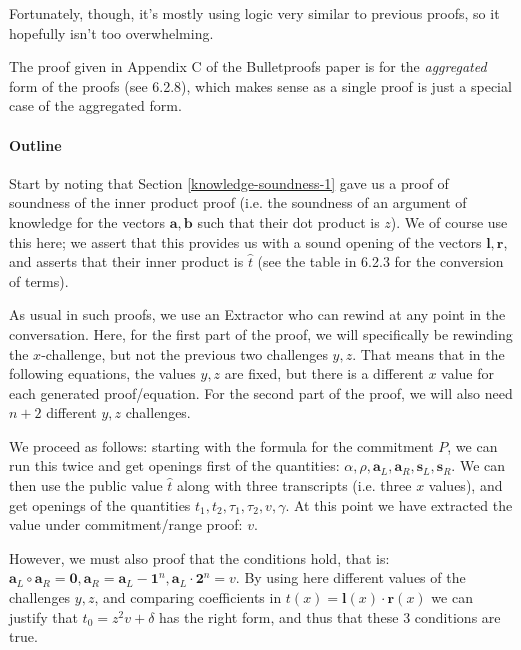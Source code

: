 \documentclass[10pt,a4paper]{article}
\begin{document}
Fortunately, though, it's mostly using logic very similar to previous
proofs, so it hopefully isn't too overwhelming.

The proof given in Appendix C of the Bulletproofs paper is for the
\emph{aggregated} form of the proofs (see 6.2.8), which makes sense as a
single proof is just a special case of the aggregated form.

\hypertarget{outline}{%
\paragraph[Outline]{\texorpdfstring{\protect\hypertarget{anchor-64}{}{}Outline}{Outline}}\label{outline}}

Start by noting that Section \ref{knowledge-soundness-1} gave us a proof of soundness of the
inner product proof (i.e. the soundness of an argument of knowledge for
the vectors $\mathbf{a}, \mathbf{b}$ such that their dot product is $z$). We of course use this
here; we assert that this provides us with a sound opening of the
vectors $\mathbf{l}, \mathbf{r}$, and asserts that their inner product is $\hat{t}$ (see the table in
6.2.3 for the conversion of terms).

As usual in such proofs, we use an Extractor who can rewind at any point
in the conversation. Here, for the first part of the proof, we will
specifically be rewinding the $x$-challenge, but not the previous two
challenges $y,z$. That means that in the following equations, the values $y,z$ are
fixed, but there is a different $x$ value for each generated proof/equation.
For the second part of the proof, we will also need $n+2$ different $y,z$
challenges.

We proceed as follows: starting with the formula for the commitment $P$, we
can run this twice and get openings first of the quantities: $\alpha, \rho, \textbf{a}_L, \textbf{a}_R, \textbf{s}_L, \textbf{s}_R$. We can
then use the public value $\hat{t}$ along with three transcripts (i.e. three $x$
values), and get openings of the quantities $t_1, t_2, \tau_1, \tau_2, v, \gamma$. At this point we have
extracted the value under commitment/range proof: $v$.

However, we must also proof that the conditions hold, that is: $\textbf{a}_L \circ \textbf{a}_R = \textbf{0}, \textbf{a}_R = \textbf{a}_L - \textbf{1}^n, \textbf{a}_L \cdot \textbf{2}^n = v$. By
using here different values of the challenges $y,z$, and comparing
coefficients in $t(x) = \textbf{l}(x) \cdot \textbf{r}(x)$ we can justify that $t_0 = z^2v + \delta$ has the right form, and thus that
these 3 conditions are true.
\end{document}
